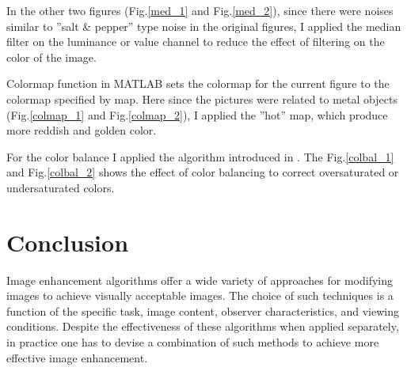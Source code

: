 \documentclass[conference]{IEEEtran}
\begin{document}
In the other two figures (Fig.\ref{med_1} and Fig.\ref{med_2}), since there were noises similar to ''salt \& pepper'' type noise in the original figures, I applied the median filter on the luminance or value channel to reduce the effect of filtering on the color of the image.

Colormap function in MATLAB sets the colormap for the current figure to the colormap specified by map. Here since the pictures were related to metal objects (Fig.\ref{colmap_1} and Fig.\ref{colmap_2}), I applied the ''hot'' map, which produce more reddish and golden color.  

For the color balance I applied the algorithm introduced in \cite{colbal}. The Fig.\ref{colbal_1} and Fig.\ref{colbal_2} shows the effect of color balancing to correct oversaturated or undersaturated colors. 

\section{Conclusion}

Image enhancement algorithms offer a wide variety of approaches for modifying images to achieve visually acceptable images. The choice of such techniques is a function of the specific task, image content, observer characteristics, and viewing conditions. Despite the effectiveness of these algorithms when applied separately, in practice one has to devise a combination of such methods to achieve more effective image enhancement.

%

\end{document}
